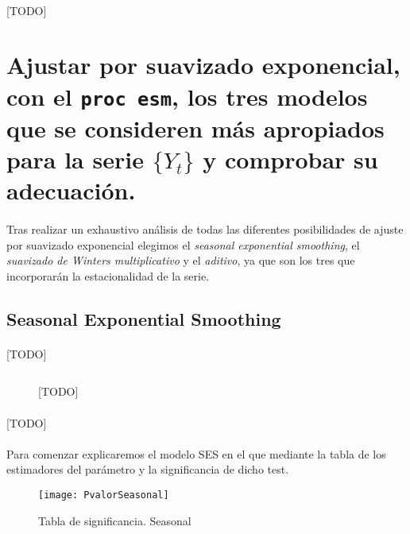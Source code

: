 \documentclass[a4paper, spanish]{article}
\begin{document}
    \paragraph{}
    [TODO]

  \section{Ajustar por suavizado exponencial, con el \texttt{proc esm}, los tres modelos que se consideren más apropiados para la serie $\{Y_t\}$ y comprobar su adecuación.}
  \label{sec:b}

    \paragraph{}
    Tras realizar un exhaustivo análisis de todas las diferentes posibilidades de ajuste por suavizado exponencial elegimos el \textit{seasonal exponential smoothing}, el \textit{suavizado de Winters multiplicativo} y el \textit{aditivo}, ya que son los tres que incorporarán la estacionalidad de la serie.\\

    \subsection{Seasonal Exponential Smoothing}

      \paragraph{}
      [TODO]

      \begin{figure}[h!]
        \centering
        \inputminted{SAS}{./res/code/b-01-esm-1.sas}
        \caption{[TODO]}
        \label{code:b_esm_1}
      \end{figure}

      \paragraph{}
      [TODO]

      \paragraph{}
      Para comenzar explicaremos el modelo SES en el que mediante la tabla de los estimadores del parámetro y la significancia de dicho test.

      \begin{figure}[h!]
        \centering
        \texttt{[image: PvalorSeasonal]}
        \caption{Tabla de significancia. Seasonal}
        \label{}
      \end{figure}
\end{document}

